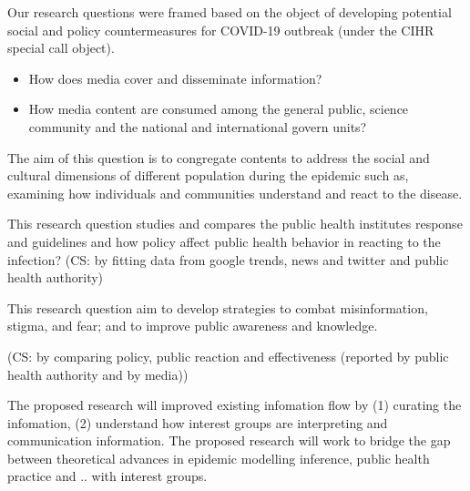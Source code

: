Our research questions were framed based on the object of developing potential social and policy countermeasures for COVID-19 outbreak (under the CIHR special call object).

\begin{itemize}
\item{How does media cover and disseminate information?}
\item{How media content are consumed among the general public, science community and the national and international govern units?}
\end{itemize}

The aim of this question is to congregate contents to address the social and cultural dimensions of different population during the epidemic such as, examining how individuals and communities understand and react to the disease.

This research question studies and compares the public health institutes response and guidelines and how policy affect public health behavior in reacting to the infection?
(CS: by fitting data from google trends, news and twitter and public health authority)


This research question aim to develop strategies to combat misinformation, stigma, and fear; and to improve public awareness and knowledge.

(CS: by comparing policy, public reaction and effectiveness (reported by public health authority and by media))

The proposed research will improved existing infomation flow by (1) curating the infomation, (2) understand how interest groups are interpreting and communication information. 
The proposed research will work to bridge the gap between theoretical advances in epidemic modelling inference, public health practice and .. with interest groups. 


